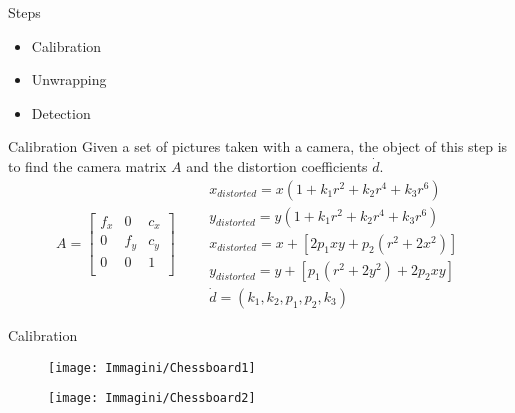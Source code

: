 \begin{frame}[t,plain]
\titlepage
\end{frame}

\begin{frame}{Steps}
	\begin{itemize}
		\item Calibration
		\item Unwrapping
		\item Detection
	\end{itemize}
\end{frame}


\begin{frame}{Calibration}
	Given a set of pictures taken with a camera, the object of this step is to find the camera matrix $A$ and the distortion coefficients $\dot{d}$.\newline
	\vfill
	\[
		A=\begin{bmatrix}
			f_x&0&c_x\\
			0&f_y&c_y\\
			0&0&1\\
		\end{bmatrix}\qquad
		\begin{matrix}
			x_{distorted}=x\left(1+k_1r^2+k_2r^4+k_3r^6\right)\\
			y_{distorted}=y\left(1+k_1r^2+k_2r^4+k_3r^6\right)\\
			x_{distorted}=x+\left[2p_1xy+p_2\left(r^2+2x^2\right)\right]\\
			y_{distorted}=y+\left[p_1\left(r^2+2y^2\right)+2p_2xy\right]\\
			\dot{d}=(k_1, k_2, p_1, p_2, k_3)
		\end{matrix}
	\]
	\vfill
\end{frame}


\begin{frame}{Calibration}
	\begin{figure}[H]
		\begin{minipage}{0.48\linewidth}
			\texttt{[image: Immagini/Chessboard1]}
		\end{minipage}
		\vspace{0.04\linewidth}
		\begin{minipage}{0.48\linewidth}
			\texttt{[image: Immagini/Chessboard2]}
		\end{minipage}
	\end{figure}
\end{frame}


